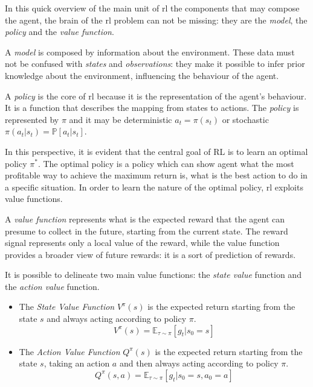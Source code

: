 In this quick overview of the main unit of \acrshort{rl} the components that may compose the agent, the brain of the \acrshort{rl} problem can not be missing: they are the \textit{model}, the \textit{policy} and the \textit{value function}.

A \textit{model} is composed by information about the environment. These data must not be confused with \textit{states} and \textit{observations}: they make it possible to infer prior knowledge about the environment, influencing the behaviour of the agent.

A \textit{policy} is the core of \acrshort{rl} because it is the representation of the agent's behaviour. It is a function that describes the mapping from states to actions.  The \textit{policy} is represented by $\pi$ and it may be deterministic  $a_t = \pi(s_t)$  or stochastic $\pi(a_t|s_t) = \mathbb{P}[a_t | s_t]$.

In this perspective, it is evident that the central goal of RL is to learn an optimal policy $\pi^*$. The optimal policy is a policy which can show agent what the most profitable way to achieve the maximum return is, what is the best action to do in a specific situation. In order to learn the nature of the optimal policy, \acrshort{rl} exploits value functions.

A \textit{value function} represents what is the expected reward that the agent can presume to collect in the future, starting from the current state. The reward signal represents only a local value of the reward, while the value function provides a broader view of future rewards: it is a sort of prediction of rewards.

It is possible to delineate two main value functions: the \textit{state value} function and the \textit{action value} function.

\begin{itemize}
	\item The \textit{State Value Function} $V^\pi(s)$ is the expected return starting from the state $s$ and always acting according to policy $\pi$.
	\begin{equation} \label{eq:statevalue}
		V^\pi(s) = \mathbb{E}_{\tau \sim \pi}[g_t | s_0 = s]
	\end{equation}
	\item The \textit{Action Value Function} $Q^\pi(s)$ is the expected return starting from the state $s$, taking an action $a$ and then always acting according to policy $\pi$.
	\begin{equation} \label{eq:actionvalue}
	Q^\pi(s, a) = \mathbb{E}_{\tau \sim \pi}[g_t | s_0 = s, a_0 = a]
	\end{equation}
\end{itemize}

